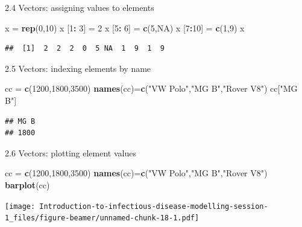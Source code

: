 \documentclass[
  ignorenonframetext,
]{beamer}
\newenvironment{Shaded}{\begin{snugshade}}{\end{snugshade}}
\newcommand{\ConstantTok}[1]{\textcolor[rgb]{0.56,0.35,0.01}{#1}}
\newcommand{\DecValTok}[1]{\textcolor[rgb]{0.00,0.00,0.81}{#1}}
\newcommand{\FunctionTok}[1]{\textcolor[rgb]{0.13,0.29,0.53}{\textbf{#1}}}
\newcommand{\NormalTok}[1]{#1}
\newcommand{\OtherTok}[1]{\textcolor[rgb]{0.56,0.35,0.01}{#1}}
\newcommand{\SpecialCharTok}[1]{\textcolor[rgb]{0.81,0.36,0.00}{\textbf{#1}}}
\newcommand{\StringTok}[1]{\textcolor[rgb]{0.31,0.60,0.02}{#1}}
\begin{document}
\begin{frame}[fragile]{2.4 Vectors: assigning values to elements}
\protect\hypertarget{vectors-assigning-values-to-elements}{}
\begin{Shaded}
\begin{Highlighting}[]
\NormalTok{x }\OtherTok{=} \FunctionTok{rep}\NormalTok{(}\DecValTok{0}\NormalTok{,}\DecValTok{10}\NormalTok{)}
\NormalTok{x [}\DecValTok{1}\SpecialCharTok{:} \DecValTok{3}\NormalTok{] }\OtherTok{=} \DecValTok{2}
\NormalTok{x [}\DecValTok{5}\SpecialCharTok{:} \DecValTok{6}\NormalTok{] }\OtherTok{=} \FunctionTok{c}\NormalTok{(}\DecValTok{5}\NormalTok{,}\ConstantTok{NA}\NormalTok{)}
\NormalTok{x [}\DecValTok{7}\SpecialCharTok{:}\DecValTok{10}\NormalTok{] }\OtherTok{=} \FunctionTok{c}\NormalTok{(}\DecValTok{1}\NormalTok{,}\DecValTok{9}\NormalTok{)}
\NormalTok{x}
\end{Highlighting}
\end{Shaded}

\begin{verbatim}
##  [1]  2  2  2  0  5 NA  1  9  1  9
\end{verbatim}
\end{frame}

\begin{frame}[fragile]{2.5 Vectors: indexing elements by name}
\protect\hypertarget{vectors-indexing-elements-by-name}{}
\begin{Shaded}
\begin{Highlighting}[]
\NormalTok{cc }\OtherTok{=} \FunctionTok{c}\NormalTok{(}\DecValTok{1200}\NormalTok{,}\DecValTok{1800}\NormalTok{,}\DecValTok{3500}\NormalTok{)}
\FunctionTok{names}\NormalTok{(cc)}\OtherTok{=}\FunctionTok{c}\NormalTok{(}\StringTok{"VW Polo"}\NormalTok{,}\StringTok{"MG B"}\NormalTok{,}\StringTok{"Rover V8"}\NormalTok{)}
\NormalTok{cc[}\StringTok{"MG B"}\NormalTok{]}
\end{Highlighting}
\end{Shaded}

\begin{verbatim}
## MG B 
## 1800
\end{verbatim}
\end{frame}

\begin{frame}[fragile]{2.6 Vectors: plotting element values}
\protect\hypertarget{vectors-plotting-element-values}{}
\begin{Shaded}
\begin{Highlighting}[]
\NormalTok{cc }\OtherTok{=} \FunctionTok{c}\NormalTok{(}\DecValTok{1200}\NormalTok{,}\DecValTok{1800}\NormalTok{,}\DecValTok{3500}\NormalTok{)}
\FunctionTok{names}\NormalTok{(cc)}\OtherTok{=}\FunctionTok{c}\NormalTok{(}\StringTok{"VW Polo"}\NormalTok{,}\StringTok{"MG B"}\NormalTok{,}\StringTok{"Rover V8"}\NormalTok{)}
\FunctionTok{barplot}\NormalTok{(cc)}
\end{Highlighting}
\end{Shaded}

\texttt{[image: Introduction-to-infectious-disease-modelling-session-1\_files/figure-beamer/unnamed-chunk-18-1.pdf]}
\end{frame}
\end{document}
